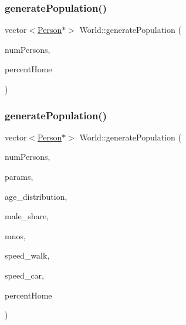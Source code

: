\subsubsection{\texorpdfstring{generate\+Population()}{generatePopulation()}\hspace{0.1cm}{\footnotesize\ttfamily [1/2]}}
{\footnotesize\ttfamily vector$<$\hyperlink{class_person}{Person}$\ast$$>$ World\+::generate\+Population (\begin{DoxyParamCaption}\item[{unsigned long}]{num\+Persons,  }\item[{double}]{percent\+Home }\end{DoxyParamCaption})\hspace{0.3cm}{\ttfamily [private]}}

\mbox{\label{class_world_a7648b24daba6b22f7fe85d5b1dc53d5e}} 
\subsubsection{\texorpdfstring{generate\+Population()}{generatePopulation()}\hspace{0.1cm}{\footnotesize\ttfamily [2/2]}}
{\footnotesize\ttfamily vector$<$\hyperlink{class_person}{Person}$\ast$$>$ World\+::generate\+Population (\begin{DoxyParamCaption}\item[{const unsigned long}]{num\+Persons,  }\item[{vector$<$ double $>$}]{params,  }\item[{\hyperlink{class_person_a53376a9a5852ec7760488a01c37f0b0b}{Person\+::\+Age\+Distributions}}]{age\+\_\+distribution,  }\item[{double}]{male\+\_\+share,  }\item[{vector$<$ \hyperlink{class_mobile_operator}{Mobile\+Operator} $\ast$$>$}]{mnos,  }\item[{double}]{speed\+\_\+walk,  }\item[{double}]{speed\+\_\+car,  }\item[{double}]{percent\+Home }\end{DoxyParamCaption})\hspace{0.3cm}{\ttfamily [private]}}

\mbox{\label{class_world_a8cf8a54ae1f3cb61efeba2b3acebb7cc}} 
